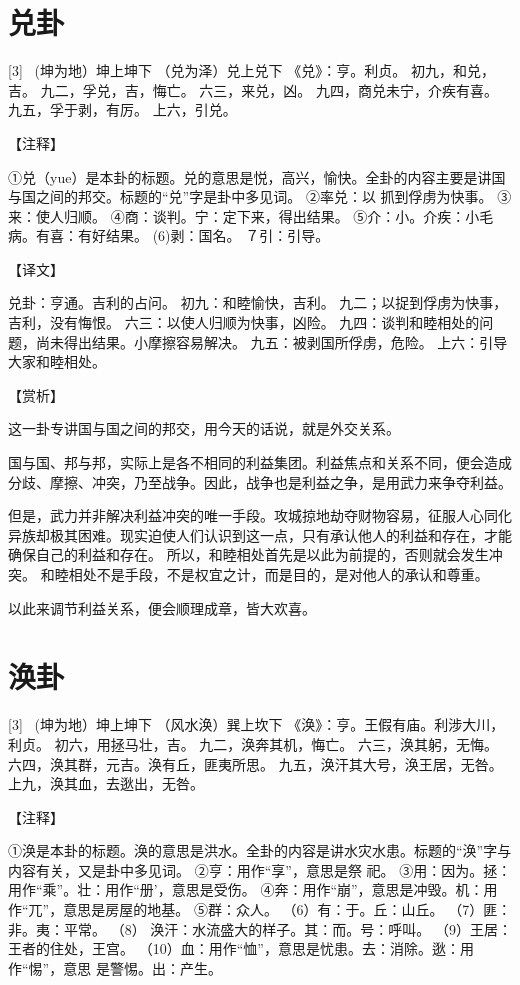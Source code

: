 \documentclass[12pt,UTF8]{ctexbook}
\begin{document}
\chapter{兑卦}
[3] \ (坤为地）坤上坤下
（兑为泽）兑上兑下
《兑》：亨。利贞。
初九，和兑，吉。
九二，孚兑，吉，悔亡。
六三，来兑，凶。
九四，商兑未宁，介疾有喜。
九五，孚于剥，有厉。
上六，引兑。

【注释】

①兑（yue）是本卦的标题。兑的意思是悦，高兴，愉快。全卦的内容主要是讲国与国之间的邦交。标题的“兑”字是卦中多见词。
②率兑：以 抓到俘虏为快事。
③来：使人归顺。
④商：谈判。宁：定下来，得出结果。
⑤介：小。介疾：小毛病。有喜：有好结果。
(6)剥：国名。
７引：引导。

【译文】

兑卦：亨通。吉利的占问。
初九：和睦愉快，吉利。
九二；以捉到俘虏为快事，吉利，没有悔恨。
六三：以使人归顺为快事，凶险。
九四：谈判和睦相处的问题，尚未得出结果。小摩擦容易解决。
九五：被剥国所俘虏，危险。
上六：引导大家和睦相处。

【赏析】

这一卦专讲国与国之间的邦交，用今天的话说，就是外交关系。

国与国、邦与邦，实际上是各不相同的利益集团。利益焦点和关系不同，便会造成分歧、摩擦、冲突，乃至战争。因此，战争也是利益之争，是用武力来争夺利益。

但是，武力并非解决利益冲突的唯一手段。攻城掠地劫夺财物容易，征服人心同化异族却极其困难。现实迫使人们认识到这一点，只有承认他人的利益和存在，才能确保自己的利益和存在。 所以，和睦相处首先是以此为前提的，否则就会发生冲突。 和睦相处不是手段，不是权宜之计，而是目的，是对他人的承认和尊重。

以此来调节利益关系，便会顺理成章，皆大欢喜。

\chapter{涣卦}
[3] \ (坤为地）坤上坤下
（风水涣）巽上坎下
《涣》：亨。王假有庙。利涉大川，利贞。
初六，用拯马壮，吉。
九二，涣奔其机，悔亡。
六三，涣其躬，无悔。
六四，涣其群，元吉。涣有丘，匪夷所思。
九五，涣汗其大号，涣王居，无咎。
上九，涣其血，去逖出，无咎。

【注释】

①涣是本卦的标题。涣的意思是洪水。全卦的内容是讲水灾水患。标题的“涣”字与内容有关，又是卦中多见词。
②亨：用作“享”，意思是祭 祀。
③用：因为。拯：用作“乘”。壮：用作“册’，意思是受伤。
④奔：用作“崩”，意思是冲毁。机：用作“兀”，意思是房屋的地基。
⑤群：众人。
（6）有：于。丘：山丘。
（7）匪：非。夷：平常。
（8） 涣汗：水流盛大的样子。其：而。号：呼叫。
（9）王居：王者的住处，王宫。
（10）血：用作“恤”，意思是忧患。去：消除。逖：用作“惕”，意思 是警惕。出：产生。
\end{document}
